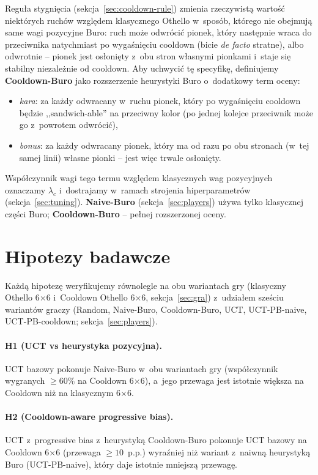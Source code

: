 \documentclass[11pt,a4paper]{article}
\begin{document}
Reguła stygnięcia (sekcja~\ref{sec:cooldown-rule}) zmienia rzeczywistą wartość niektórych ruchów względem klasycznego Othello w~sposób, którego nie obejmują same wagi pozycyjne Buro: ruch może odwrócić pionek, który następnie wraca do przeciwnika natychmiast po wygaśnięciu cooldown (bicie \emph{de facto} stratne), albo odwrotnie -- pionek jest osłonięty z~obu stron własnymi pionkami i~staje się stabilny niezależnie od cooldown. Aby uchwycić tę specyfikę, definiujemy \textbf{Cooldown-Buro} jako rozszerzenie heurystyki Buro o~dodatkowy term oceny:
\begin{itemize}[leftmargin=1.5em,itemsep=2pt]
    \item \emph{kara}: za każdy odwracany w~ruchu pionek, który po wygaśnięciu cooldown będzie ,,sandwich-able'' na przeciwny kolor (po jednej kolejce przeciwnik może go z~powrotem odwrócić),
    \item \emph{bonus}: za każdy odwracany pionek, który ma od razu po obu stronach (w~tej samej linii) własne pionki -- jest więc trwale osłonięty.
\end{itemize}
Współczynnik wagi tego termu względem klasycznych wag pozycyjnych oznaczamy $\lambda_c$ i~dostrajamy w~ramach strojenia hiperparametrów (sekcja~\ref{sec:tuning}). \textbf{Naive-Buro} (sekcja~\ref{sec:players}) używa tylko klasycznej części Buro; \textbf{Cooldown-Buro} -- pełnej rozszerzonej oceny.

\section{Hipotezy badawcze}

Każdą hipotezę weryfikujemy równolegle na obu wariantach gry (klasyczny Othello 6$\times$6 i~Cooldown Othello 6$\times$6, sekcja~\ref{sec:gra}) z~udziałem sześciu wariantów graczy (Random, Naive-Buro, Cooldown-Buro, UCT, UCT-PB-naive, UCT-PB-cooldown; sekcja~\ref{sec:players}).

\paragraph{H1 (UCT vs heurystyka pozycyjna).}
UCT bazowy pokonuje Naive-Buro w~obu wariantach gry (współczynnik wygranych $\geq 60\%$ na Cooldown 6$\times$6), a~jego przewaga jest istotnie większa na Cooldown niż na klasycznym 6$\times$6.

\paragraph{H2 (Cooldown-aware progressive bias).}
UCT z~progressive bias z~heurystyką Cooldown-Buro pokonuje UCT bazowy na Cooldown 6$\times$6 (przewaga $\geq 10$~p.p.) wyraźniej niż wariant z~naiwną heurystyką Buro (UCT-PB-naive), który daje istotnie mniejszą przewagę.
\end{document}
